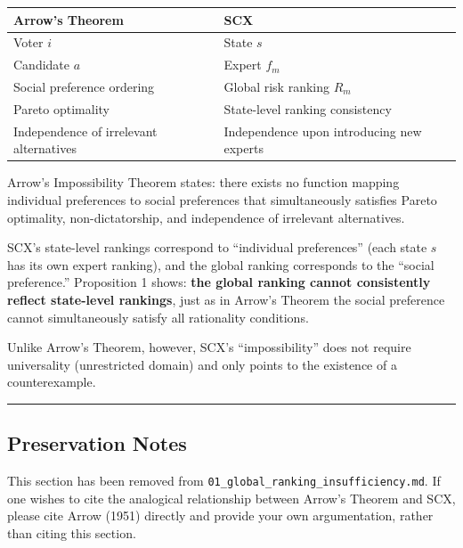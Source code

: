 \documentclass[
  12pt,
]{ctexart}
\begin{document}
\begin{longtable}[]{@{}ll@{}}
\toprule\noalign{}
Arrow's Theorem & SCX \\
\midrule\noalign{}
\endhead
\bottomrule\noalign{}
\endlastfoot
Voter \(i\) & State \(s\) \\
Candidate \(a\) & Expert \(f_m\) \\
Social preference ordering & Global risk ranking \(R_m\) \\
Pareto optimality & State-level ranking consistency \\
Independence of irrelevant alternatives & Independence upon introducing new experts \\
\end{longtable}

Arrow's Impossibility Theorem states: there exists no function mapping individual preferences to social preferences that simultaneously satisfies Pareto optimality, non-dictatorship, and independence of irrelevant alternatives.

SCX's state-level rankings correspond to ``individual preferences'' (each state \(s\) has its own expert ranking), and the global ranking corresponds to the ``social preference.'' Proposition 1 shows: \textbf{the global ranking cannot consistently reflect state-level rankings}, just as in Arrow's Theorem the social preference cannot simultaneously satisfy all rationality conditions.

Unlike Arrow's Theorem, however, SCX's ``impossibility'' does not require universality (unrestricted domain) and only points to the existence of a counterexample.

\begin{center}\rule{0.5\linewidth}{0.5pt}\end{center}

\subsection{Preservation Notes}\label{preservation-notes}

This section has been removed from \texttt{01\_global\_ranking\_insufficiency.md}. If one wishes to cite the analogical relationship between Arrow's Theorem and SCX, please cite Arrow (1951) directly and provide your own argumentation, rather than citing this section.
\end{document}
